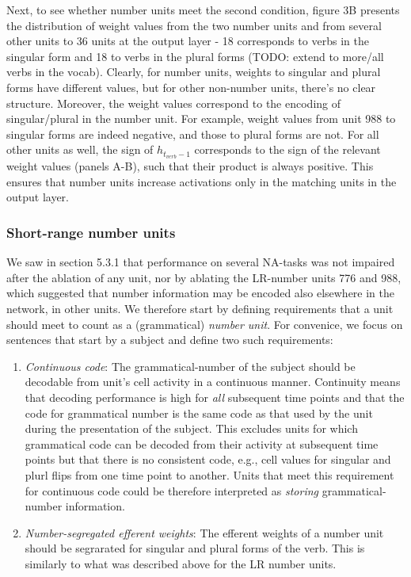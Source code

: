 Next, to see whether number units meet the second condition, figure 3B presents the distribution of weight values from the two number units and from several other units to 36 units at the output layer - 18 corresponds to verbs in the singular form and 18 to verbs in the plural forms (TODO: extend to more/all verbs in the vocab). Clearly, for number units, weights to singular and plural forms have different values, but for other non-number units, there's no clear structure. Moreover, the weight values correspond to the encoding of singular/plural in the number unit. For example, weight values from unit 988 to singular forms are indeed negative, and those to plural forms are not. For all other units as well, the sign of $h_{t_{verb}-1}$ corresponds to the sign of the relevant weight values (panels A-B), such that their product is always positive. This ensures that number units increase activations only in the matching units in the output layer.

\subsubsection{Short-range number units}
We saw in section 5.3.1 that performance on several NA-tasks was not impaired after the ablation of any unit, nor by ablating the LR-number units 776 and 988, which suggested that number information may be encoded also elsewhere in the network, in other units. We therefore start by defining requirements that a unit should meet to count as a (grammatical) \textit{number unit}. For convenice, we focus on sentences that start by a subject and define two such requirements: 
\begin{enumerate}

\item \textit{Continuous code}: The grammatical-number of the subject should be decodable from unit's cell activity in a continuous manner. Continuity means that decoding performance is high for \textit{all} subsequent time points and that the code for grammatical number is the same code as that used by the unit during the presentation of the subject. This excludes units for which grammatical code can be decoded from their activity at subsequent time points but that there is no consistent code, e.g., cell values for singular and plurl flips from one time point to another. Units that meet this requirement for continuous code could be therefore interpreted as \textit{storing} grammatical-number information.

\item \textit{Number-segregated efferent weights}: The efferent weights of a number unit should be segrarated for singular and plural forms of the verb. This is similarly to what was described above for the LR number units. 


\end{enumerate}

